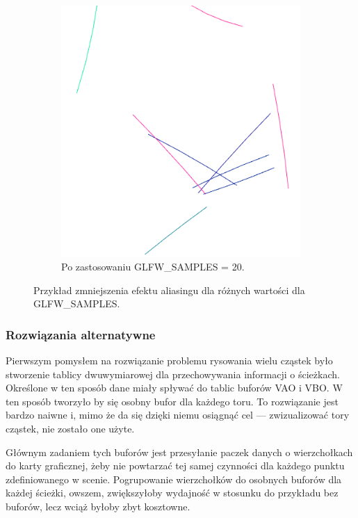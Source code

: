 \begin{figure}[H]
\begin{subfigure}{0.5\textwidth}
		\includegraphics[width=\textwidth]{Wart20.png}
    	\caption{Po zastosowaniu GLFW\_SAMPLES = 20.}
		\label{rys16}
	\end{subfigure}
    \caption{Przykład zmniejszenia efektu aliasingu dla różnych wartości dla GLFW\_SAMPLES.}
    \label{rys17}
\end{figure}

\subsubsection{Rozwiązania alternatywne}

Pierwszym pomysłem na rozwiązanie problemu rysowania wielu cząstek było stworzenie tablicy dwuwymiarowej dla przechowywania informacji o ścieżkach. Określone w ten sposób dane miały spływać do tablic buforów VAO i VBO. W ten sposób tworzyło by się osobny bufor dla każdego toru. To rozwiązanie jest bardzo naiwne i, mimo że da się dzięki niemu osiągnąć cel --- zwizualizować tory cząstek, nie zostało one użyte. 

Głównym zadaniem tych buforów jest przesyłanie paczek danych o wierzchołkach do karty graficznej, żeby nie powtarzać tej samej czynności dla każdego punktu zdefiniowanego w scenie. Pogrupowanie wierzchołków do osobnych buforów dla każdej ścieżki, owszem, zwiększyłoby wydajność w stosunku do przykładu bez buforów, lecz wciąż byłoby zbyt kosztowne.

